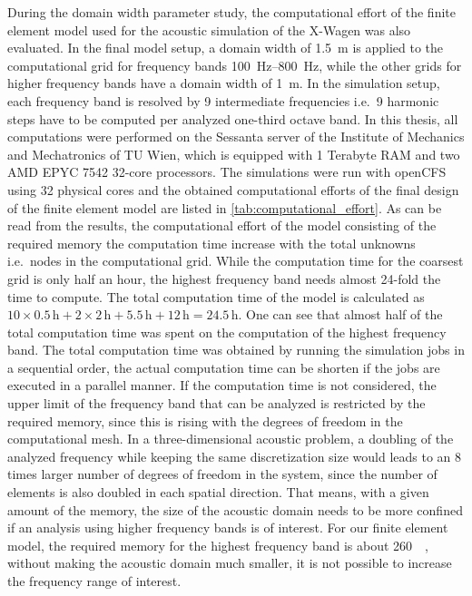 During the domain width parameter study, the computational effort of the finite element model used for the acoustic simulation of the X-Wagen was also evaluated. In the final model setup, a domain width of \SI{1.5}{\meter} is applied to the computational grid for frequency bands \SIrange{100}{800}{\hertz}, while the other grids for higher frequency bands have a domain width of \SI{1}{\meter}. In the simulation setup, each frequency band is resolved by 9 intermediate frequencies i.e.\ 9 harmonic steps have to be computed per analyzed one-third octave band. In this thesis, all computations were performed on the Sessanta server of the Institute of Mechanics and Mechatronics of TU Wien, which is equipped with 1 Terabyte RAM and two AMD EPYC 7542 32-core processors. The simulations were run with openCFS using 32 physical cores and the obtained computational efforts of the final design of the finite element model are listed in \cref{tab:computational_effort}. As can be read from the results, the computational effort of the model consisting of the required memory the computation time increase with the total unknowns i.e.\ nodes in the computational grid. While the computation time for the coarsest grid is only half an hour, the highest frequency band needs almost 24-fold the time to compute. The total computation time of the model is calculated as $10\times 0.5\,\text{h} + 2\times 2\,\text{h} + 5.5\,\text{h} + 12\,\text{h} = 24.5\,\text{h}$. One can see that almost half of the total computation time was spent on the computation of the highest frequency band. The total computation time was obtained by running the simulation jobs in a sequential order, the actual computation time can be shorten if the jobs are executed in a parallel manner. If the computation time is not considered, the upper limit of the frequency band that can be analyzed is restricted by the required memory, since this is rising with the degrees of freedom in the computational mesh. In a three-dimensional acoustic problem, a doubling of the analyzed frequency while keeping the same discretization size would leads to an 8 times larger number of degrees of freedom in the system, since the number of elements is also doubled in each spatial direction. That means, with a given amount of the memory, the size of the acoustic domain needs to be more confined if an analysis using higher frequency bands is of interest. For our finite element model, the required memory for the highest frequency band is about \SI{260}{\giga\byte}, without making the acoustic domain much smaller, it is not possible to increase the frequency range of interest.

